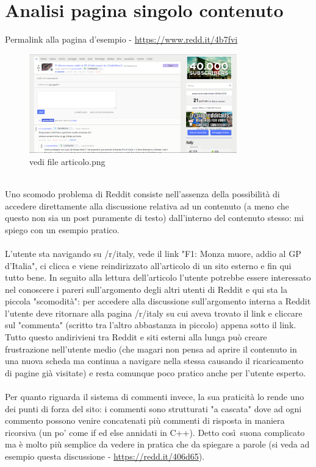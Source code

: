 \documentclass[12pt]{article}
\begin{document}
\section{Analisi pagina singolo contenuto}
Permalink alla pagina d'esempio - \url{https://www.redd.it/4b7fvi}
\\
\begin{figure}[ht!]
\centering
\includegraphics[width=90mm]{articolo}
\caption{vedi file articolo.png}
\end{figure}
\\
Uno scomodo problema di Reddit consiste nell'assenza della possibilit\`a di accedere direttamente alla discussione relativa ad un contenuto (a meno che questo non sia un post puramente di testo) dall'interno del contenuto stesso: mi spiego con un esempio pratico. \\ \\L'utente sta navigando su /r/italy, vede il link "F1: Monza muore, addio al GP d'Italia", ci clicca e viene reindirizzato all'articolo di un sito esterno e fin qui tutto bene. In seguito alla lettura dell'articolo l'utente potrebbe essere interessato nel conoscere i pareri sull'argomento degli altri utenti di Reddit e qui sta la piccola "scomodit\`a":  per accedere alla discussione sull'argomento interna a Reddit l'utente deve ritornare alla pagina /r/italy su cui aveva trovato il link e cliccare sul "commenta" (scritto tra l'altro abbastanza in piccolo) appena sotto il link. \\Tutto questo andirivieni tra Reddit e siti esterni alla lunga pu\`o creare frustrazione nell'utente medio (che magari non pensa ad aprire il contenuto in una nuova scheda ma continua a navigare nella stessa causando il ricaricamento di pagine gi\`a visitate) e resta comunque poco pratico anche per l'utente esperto. \\ \\
Per quanto riguarda il sistema di commenti invece, la sua praticit\`a lo rende uno dei punti di forza del sito: i commenti sono strutturati "a cascata" dove ad ogni commento possono venire concatenati pi\`u commenti di risposta in maniera ricorsiva (un po' come if ed else annidati in C++). Detto cos\`i\ suona complicato ma \`e molto pi\`u semplice da vedere in pratica che da spiegare a parole (si veda ad esempio questa discussione - \url{https://redd.it/406d65}). \\ \\
\end{document}
